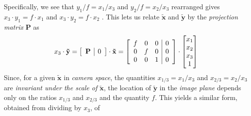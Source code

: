 Specifically, we see that $y_1/f=x_1/x_3$ and $y_2/f=x_2/x_3$ rearranged gives $x_3\cdot y_1=f\cdot x_1$ and $x_3\cdot y_2=f\cdot x_2$ . This lets us relate $\mathbf{\tilde{x}}$ and $\mathbf{\tilde{y}}$ by the \textit{projection matrix} $\mathbf{P}$ as
\begin{equation*}
\begin{split}
x_3\cdot\mathbf{\tilde{y}}
=
\left[\begin{array}{c|c}\mathbf{P} & 0\end{array}\right]\cdot\mathbf{\tilde{x}}
=
\left[\begin{array}{ccc|c}
f & 0 & 0 & 0\\
0 & f & 0 & 0\\
0 & 0 & 1 & 0\\
\end{array}\right]
\cdot\begin{bmatrix}x_1\\x_2\\x_3\\1\end{bmatrix}
\end{split}
\end{equation*}%
Since, for a given $\mathbf{\tilde{x}}$ in \textit{camera space}, the quantities 
$x_{1/3}=x_1/x_3$ and $x_{2/3}=x_2/x_3$ 
are \textit{invariant under the scale of $\mathbf{\tilde{x}}$}, 
the location of $\mathbf{\tilde{y}}$ in the \textit{image plane} depends only on the ratios $x_{1/3}$ and $x_{2/3}$ and the quantity $f$. This yields a similar form, obtained from dividing by $x_3$, of

